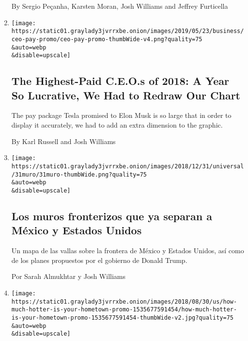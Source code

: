 \begin{enumerate}
  By Sergio Peçanha, Karsten Moran, Josh Williams and Jeffrey Furticella
\item
  \href{/interactive/2019/business/highest-paid-ceos-2018.html}{}

  \texttt{[image: https://static01.graylady3jvrrxbe.onion/images/2019/05/23/business/ceo-pay-promo/ceo-pay-promo-thumbWide-v4.png?quality=75\\\&auto=webp\\\&disable=upscale]}

  \hypertarget{the-highest-paid-ceos-of-2018-a-year-so-lucrative-we-had-to-redraw-our-chart}{%
  \subsection{The Highest-Paid C.E.O.s of 2018: A Year So Lucrative, We
  Had to Redraw Our
  Chart}\label{the-highest-paid-ceos-of-2018-a-year-so-lucrative-we-had-to-redraw-our-chart}}

  The pay package Tesla promised to Elon Musk is so large that in order
  to display it accurately, we had to add an extra dimension to the
  graphic.

  By Karl Russell and Josh Williams
\item
  \href{/es/interactive/2018/12/27/universal/muro-fronterizo-mexico-estados-unidos.html}{}

  \texttt{[image: https://static01.graylady3jvrrxbe.onion/images/2018/12/31/universal/31muro/31muro-thumbWide.png?quality=75\\\&auto=webp\\\&disable=upscale]}

  \hypertarget{los-muros-fronterizos-que-ya-separan-a-muxe9xico-y-estados-unidos}{%
  \subsection{Los muros fronterizos que ya separan a México y Estados
  Unidos}\label{los-muros-fronterizos-que-ya-separan-a-muxe9xico-y-estados-unidos}}

  Un mapa de las vallas sobre la frontera de México y Estados Unidos,
  así como de los planes propuestos por el gobierno de Donald Trump.

  Por Sarah Almukhtar y Josh Williams
\item
  \href{/interactive/2018/08/30/climate/how-much-hotter-is-your-hometown.html}{}

  \texttt{[image: https://static01.graylady3jvrrxbe.onion/images/2018/08/30/us/how-much-hotter-is-your-hometown-promo-1535677591454/how-much-hotter-is-your-hometown-promo-1535677591454-thumbWide-v2.jpg?quality=75\\\&auto=webp\\\&disable=upscale]}


\end{enumerate}
